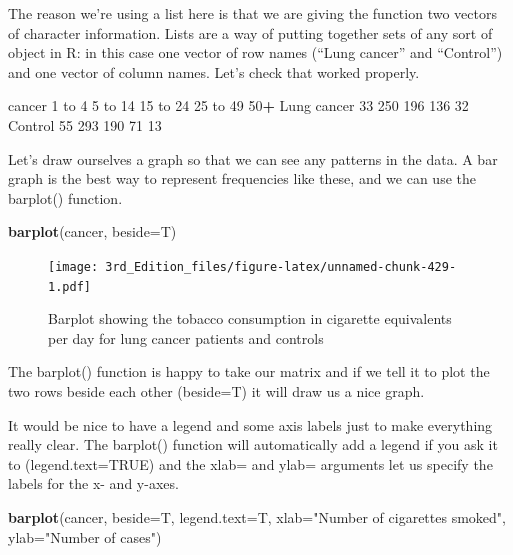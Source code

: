 \documentclass[
]{book}
\newenvironment{Shaded}{\begin{snugshade}}{\end{snugshade}}
\newcommand{\DataTypeTok}[1]{\textcolor[rgb]{0.13,0.29,0.53}{#1}}
\newcommand{\DecValTok}[1]{\textcolor[rgb]{0.00,0.00,0.81}{#1}}
\newcommand{\KeywordTok}[1]{\textcolor[rgb]{0.13,0.29,0.53}{\textbf{#1}}}
\newcommand{\NormalTok}[1]{#1}
\newcommand{\OperatorTok}[1]{\textcolor[rgb]{0.81,0.36,0.00}{\textbf{#1}}}
\newcommand{\StringTok}[1]{\textcolor[rgb]{0.31,0.60,0.02}{#1}}
\begin{document}
The reason we're using a list here is that we are giving the function two vectors of character information. Lists are a way of putting together sets of any sort of object in R: in this case one vector of row names (``Lung cancer'' and ``Control'') and one vector of column names. Let's check that worked properly.

\begin{Shaded}
\begin{Highlighting}[]
\NormalTok{cancer}
            \DecValTok{1}\NormalTok{ to }\DecValTok{4} \DecValTok{5}\NormalTok{ to }\DecValTok{14} \DecValTok{15}\NormalTok{ to }\DecValTok{24} \DecValTok{25}\NormalTok{ to }\DecValTok{49} \DecValTok{50}\OperatorTok{+}
\NormalTok{Lung cancer     }\DecValTok{33}     \DecValTok{250}      \DecValTok{196}      \DecValTok{136}  \DecValTok{32}
\NormalTok{Control         }\DecValTok{55}     \DecValTok{293}      \DecValTok{190}       \DecValTok{71}  \DecValTok{13}
\end{Highlighting}
\end{Shaded}

Let's draw ourselves a graph so that we can see any patterns in the data. A bar graph is the best way to represent frequencies like these, and we can use the barplot() function.

\begin{Shaded}
\begin{Highlighting}[]
\KeywordTok{barplot}\NormalTok{(cancer, }\DataTypeTok{beside=}\NormalTok{T)}
\end{Highlighting}
\end{Shaded}

\begin{figure}
\centering
\texttt{[image: 3rd\_Edition\_files/figure-latex/unnamed-chunk-429-1.pdf]}
\caption{\label{fig:unnamed-chunk-429}Barplot showing the tobacco consumption in cigarette equivalents per day for lung cancer patients and controls}
\end{figure}

The barplot() function is happy to take our matrix and if we tell it to plot the two rows beside each other (beside=T) it will draw us a nice graph.

It would be nice to have a legend and some axis labels just to make everything really clear. The barplot() function will automatically add a legend if you ask it to (legend.text=TRUE) and the xlab= and ylab= arguments let us specify the labels for the x- and y-axes.

\begin{Shaded}
\begin{Highlighting}[]
\KeywordTok{barplot}\NormalTok{(cancer, }\DataTypeTok{beside=}\NormalTok{T, }\DataTypeTok{legend.text=}\NormalTok{T, }\DataTypeTok{xlab=}\StringTok{"Number of cigarettes smoked"}\NormalTok{, }\DataTypeTok{ylab=}\StringTok{"Number of cases"}\NormalTok{)}
\end{Highlighting}
\end{Shaded}
\end{document}
